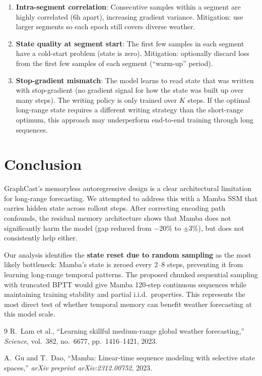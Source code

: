 \documentclass[11pt,a4paper]{article}
\begin{document}
\begin{enumerate}
  \item \textbf{Intra-segment correlation}: Consecutive samples within a segment are highly correlated (6h apart), increasing gradient variance. Mitigation: use larger segments so each epoch still covers diverse weather.

  \item \textbf{State quality at segment start}: The first few samples in each segment have a cold-start problem (state is zero). Mitigation: optionally discard loss from the first few samples of each segment (``warm-up'' period).

  \item \textbf{Stop-gradient mismatch}: The model learns to read state that was written with stop-gradient (no gradient signal for how the state was built up over many steps). The writing policy is only trained over $K$ steps. If the optimal long-range state requires a different writing strategy than the short-range optimum, this approach may underperform end-to-end training through long sequences.
\end{enumerate}

\section{Conclusion}

GraphCast's memoryless autoregressive design is a clear architectural limitation for long-range forecasting. We attempted to address this with a Mamba SSM that carries hidden state across rollout steps. After correcting encoding path confounds, the residual memory architecture shows that Mamba does not significantly harm the model (gap reduced from $-$20\% to $\pm$3\%), but does not consistently help either.

Our analysis identifies the \textbf{state reset due to random sampling} as the most likely bottleneck: Mamba's state is zeroed every 2--8 steps, preventing it from learning long-range temporal patterns. The proposed chunked sequential sampling with truncated BPTT would give Mamba 120-step continuous sequences while maintaining training stability and partial i.i.d.\ properties. This represents the most direct test of whether temporal memory can benefit weather forecasting at this model scale.

\begin{thebibliography}{9}
R.~Lam et al., ``Learning skillful medium-range global weather forecasting,'' \textit{Science}, vol.~382, no.~6677, pp.~1416--1421, 2023.

A.~Gu and T.~Dao, ``Mamba: Linear-time sequence modeling with selective state spaces,'' \textit{arXiv preprint arXiv:2312.00752}, 2023.
\end{thebibliography}
\end{document}
